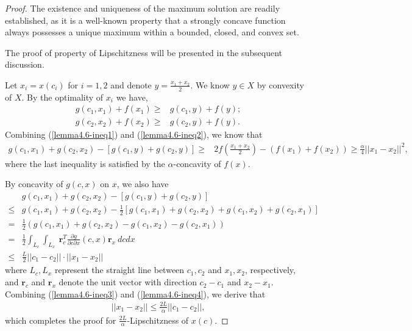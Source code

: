 \begin{proof}
\label{prf:lem:argmax:Lipschitz}
The existence and uniqueness of the maximum solution are readily established, as it is a well-known property that a strongly concave function always possesses a unique maximum within a bounded, closed, and convex set. 

The proof of property of Lipschitzness will be presented in the subsequent discussion.

Let $x_i = x(c_i)$ for $i=1,2$ and denote $y = \frac{x_1 + x_2}{2}$. We know $y\in X$ by convexity of $X$. By the optimality of $x_i$ we have,
\begin{align}
    g(c_1,x_1) + f(x_1) \ge& g(c_1,y) + f(y);\label{lemma4.6-ineq1}
    \\
    g(c_2,x_2) + f(x_2) \ge& g(c_2,y) + f(y).\label{lemma4.6-ineq2}
\end{align}
Combining (\ref{lemma4.6-ineq1}) and (\ref{lemma4.6-ineq2}), we know that
\begin{align}
    g(c_1,x_1) + g(c_2,x_2) - \left[ g(c_1,y) + g(c_2,y)\right] \ge& 2f(\frac{x_1+x_2}{2}) - (f(x_1) + f(x_2)) \ge \frac{\alpha}{4}||x_1 - x_2||^2,\label{lemma4.6-ineq3}
\end{align}
where the last inequality is satisfied by the $\alpha$-concavity of $f(x)$.

By concavity of $g(c,x)$ on $x$, we also have
\begin{align}
    &g(c_1,x_1) + g(c_2,x_2) - \left[ g(c_1,y) + g(c_2,y)\right] \nonumber\\
    \le& g(c_1,x_1) + g(c_2,x_2) - \frac{1}{2}\left[ g(c_1,x_1) + g(c_2,x_2) + g(c_1,x_2) + g(c_2,x_1) \right]
    \nonumber\\
    =& \frac{1}{2}(g(c_1,x_1) + g(c_2,x_2) - g(c_1,x_2) - g(c_2,x_1))
    \nonumber\\
    =& \frac{1}{2} \int_{L_c} \int_{L_x} \ \bm{r}_c^T \frac{\partial g}{\partial c \partial x}(c,x) \bm{r}_x \ dc dx
    \nonumber\\
    \le& \frac{L}{2} ||c_1 - c_2||\cdot ||x_1 - x_2||\label{lemma4.6-ineq4}
\end{align}
where $L_c, L_x$ represent the straight line between $c_1,c_2$ and $x_1,x_2$, respectively, and $\bm{r}_c$ and $\bm{r}_x$  denote the unit vector with direction $c_2 - c_1$ and $x_2 - x_1$.
Combining (\ref{lemma4.6-ineq3}) and (\ref{lemma4.6-ineq4}), we derive that
\begin{align*}
    ||x_1 - x_2|| \le \frac{2L}{\alpha} ||c_1 - c_2||,
\end{align*}
which completes the proof for $\frac{2L}{\alpha}$-Lipschitzness of $x(c)$.
\end{proof}